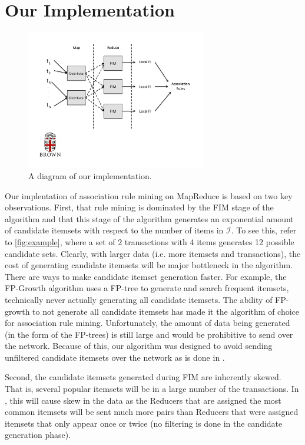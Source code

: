 \documentclass[11pt]{article}
\begin{document}
\section{Our Implementation}

\begin{figure}
\centering
\includegraphics[width=0.7\textwidth]{system_overview}
\caption{A diagram of our implementation.}
\label{fig:overview}
\end{figure}

Our implentation of association rule mining on MapReduce is based on
two key observations. First, that rule mining is dominated by the FIM
stage of the algorithm and that this stage of the algorithm generates
an exponential amount of candidate itemsets with respect to the number
of items in $\mathcal{I}$. To see this, refer to \ref{fig:example},
where a set of 2 transactions with 4 items generates 12 possible
candidate sets. Clearly, with larger data (i.e. more itemsets and
transactions), the cost of generating candidate itemsets will be major
bottleneck in the algorithm. There are ways to make candidate itemset
generation faster. For example, the FP-Growth algorithm uses a FP-tree
to generate and search frequent itemsets, technically never actually
generating all candidate itemsets. The ability of FP-growth to not
generate all candidate itemsets has made it the algorithm of choice
for association rule mining. Unfortunately, the amount of data being
generated (in the form of the FP-trees) is still large and would be
prohibitive to send over the network. Because of this, our algorithm
was designed to avoid sending unfiltered candidate itemsets over the
network as is done in \cite{Yang2010}.

Second, the candidate itemsets generated during FIM are inherently
skewed. That is, several popular itemsets will be in a large number of
the transactions. In \cite{Yang2010}, this will cause skew in the data
as the Reducers that are assigned the most common itemsets will be
sent much more pairs than Reducers that were assigned itemsets that
only appear once or twice (no filtering is done in the candidate
generation phase).
\end{document}
